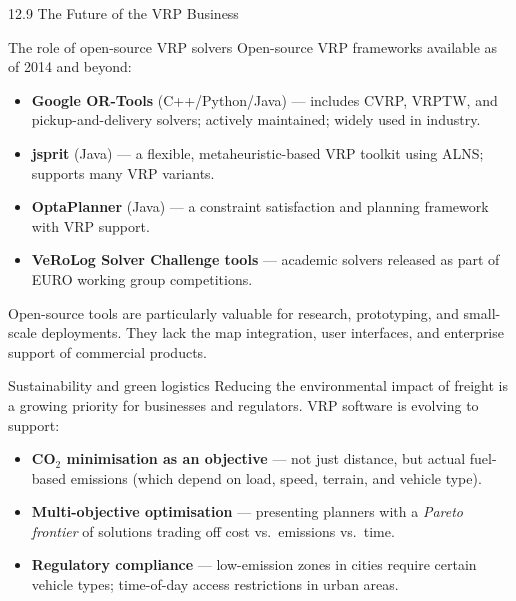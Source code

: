 \documentclass[aspectratio=169,10pt]{beamer}
\begin{document}
\begin{frame}[allowframebreaks]{12.9 \; The Future of the VRP Business}
  \begin{block}{The role of open-source VRP solvers}
    Open-source VRP frameworks available as of 2014 and beyond:
    \begin{itemize}
      \item \textbf{Google OR-Tools} (C++/Python/Java) ---
            includes CVRP, VRPTW, and pickup-and-delivery solvers;
            actively maintained; widely used in industry.
      \item \textbf{jsprit} (Java) ---
            a flexible, metaheuristic-based VRP toolkit using ALNS;
            supports many VRP variants.
      \item \textbf{OptaPlanner} (Java) ---
            a constraint satisfaction and planning framework with
            VRP support.
      \item \textbf{VeRoLog Solver Challenge tools} ---
            academic solvers released as part of EURO working group
            competitions.
    \end{itemize}
    Open-source tools are particularly valuable for research, prototyping,
    and small-scale deployments.
    They lack the map integration, user interfaces, and enterprise support
    of commercial products.
  \end{block}

  \framebreak

  \begin{block}{Sustainability and green logistics}
    Reducing the environmental impact of freight is a growing priority
    for businesses and regulators.
    VRP software is evolving to support:
    \begin{itemize}
      \item \textbf{CO$_2$ minimisation as an objective} ---
            not just distance, but actual fuel-based emissions
            (which depend on load, speed, terrain, and vehicle type).
      \item \textbf{Multi-objective optimisation} ---
            presenting planners with a \emph{Pareto frontier} of
            solutions trading off cost vs.\ emissions vs.\ time.
      \item \textbf{Regulatory compliance} ---
            low-emission zones in cities require certain vehicle types;
            time-of-day access restrictions in urban areas.
    \end{itemize}
  \end{block}


\end{frame}
\end{document}
